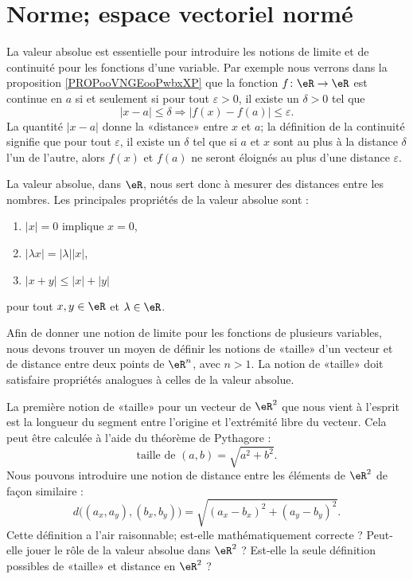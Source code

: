 \section{Norme; espace vectoriel normé}
\label{SECooWKJNooKOqpsx}

La valeur absolue est essentielle pour introduire les notions de limite et de continuité pour les fonctions d'une variable. Par exemple nous verrons dans la proposition \ref{PROPooVNGEooPwbxXP} que la fonction \( f\colon \eR\to \eR\) est continue en \( a\) si et seulement si pour tout $\varepsilon > 0$, il existe un $\delta > 0$ tel que
  \begin{equation}
    | x-a |\leq\delta \Rightarrow | f(x)-f(a) |\leq \varepsilon.
  \end{equation}
La quantité $| x-a |$ donne la «distance» entre $x$ et $a$; la définition de la continuité signifie que pour tout $\varepsilon$, il existe un $\delta$ tel que si $a$ et $x$ sont au plus à la distance $\delta$ l'un de l'autre, alors $f(x)$ et $f(a)$ ne seront éloignés au plus d'une distance $\varepsilon$.

La valeur absolue, dans $\eR$, nous sert donc à mesurer des distances entre les nombres. Les principales propriétés de la valeur absolue sont :
\begin{enumerate}

	\item
		$| x |=0$ implique $x=0$,
	\item
		$| \lambda x |=| \lambda | |x |$,
	\item
		$| x+y |\leq | x |+| y |$

\end{enumerate}
pour tout $x,y\in\eR$ et $\lambda\in\eR$.

Afin de donner une notion de limite pour les fonctions de plusieurs variables, nous devons trouver un moyen de définir les notions de «taille» d'un vecteur et de distance entre deux points de $\eR^n$, avec $n>1$. La notion de «taille» doit satisfaire propriétés analogues à celles de la valeur absolue.

La première notion de «taille» pour un vecteur de $\eR^2$ que nous vient à l'esprit est la longueur du segment entre l'origine et l'extrémité libre du vecteur. Cela peut être calculée à l'aide du théorème de Pythagore :
\begin{equation}
  \textrm{taille de } (a,b) = \sqrt{a^2+b^2}.
\end{equation}
Nous pouvons introduire une notion de distance entre les éléments de $\eR^2$ de façon similaire :
\begin{equation}
	d\big((a_x,a_y),(b_x,b_y)\big)=\sqrt{  (a_x-b_x)^2+(a_y-b_y)^2  }.
\end{equation}
Cette définition a l'air raisonnable; est-elle mathématiquement correcte ? Peut-elle jouer le rôle de la valeur absolue dans $\eR^2$ ? Est-elle la seule définition possibles de «taille» et distance en $\eR^2$ ?


